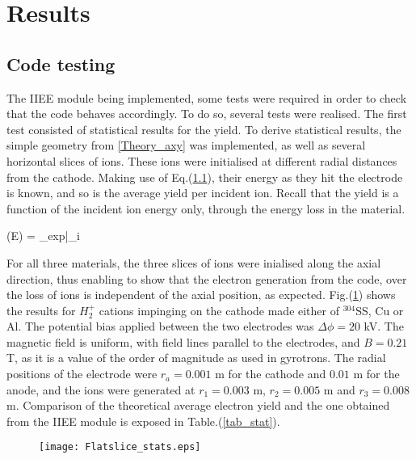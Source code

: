 \section{Results}\label{results}

\subsection{Code testing}

The IIEE module being implemented, some tests were required in order to check that the code behaves accordingly. To do so, several tests were realised. The first test consisted of statistical results for the yield. To derive statistical results, the simple geometry from \ref{Theory_axy} was implemented, as well as several horizontal slices of ions. These ions were initialised at different radial distances from the cathode. Making use of Eq.(\ref{}), their energy as they hit the electrode is known, and so is the average yield per incident ion. Recall that the yield is a function of the incident ion energy only, through the energy loss in the material. 

\beq
\gamma(E) = \Lambda_{exp}\cdot {}\Bigg|_i
\eeq 

\noindent For all three materials, the three slices of ions were inialised along the axial direction, thus enabling to show that the electron generation from the code, over the loss of ions is independent of the axial position, as expected. Fig.(\ref{flat_slice}) shows the results for $H_2^{+}$ cations impinging on the cathode made either of $^{304}$SS, Cu or Al. The potential bias applied between the two electrodes was $\Delta \phi=20$ kV. The magnetic field is uniform, with field lines parallel to the electrodes, and $B=0.21$ T, as it is a value of the order of magnitude as used in gyrotrons. The radial positions of the electrode were $r_a=0.001$ m for the cathode and $0.01$ m for the anode, and the ions were generated at $r_1 = 0.003$ m, $r_2=0.005$ m and $r_3=0.008$ m. Comparison of the theoretical average electron yield and the one obtained from the IIEE module is exposed in Table.(\ref{tab_stat}). 

\begin{figure}[h!]
\centering
	\texttt{[image: Flatslice\_stats.eps]}
	\caption{\label{flat_slice} }
\end{figure}  


